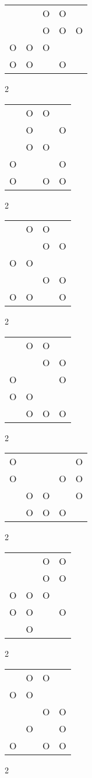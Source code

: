 \begin{tabular}{|m{0.2cm}m{0.2cm}m{0.2cm}m{0.2cm}m{0.2cm}|}\hline
 & &O&O& \\
 & &O&O&O\\
O&O&O& & \\
O&O& &O& \\
\hline\end{tabular}2
\begin{tabular}{|m{0.2cm}m{0.2cm}m{0.2cm}m{0.2cm}|}\hline
 &O&O& \\
 &O& &O\\
 &O&O& \\
O& & &O\\
O& &O&O\\
\hline\end{tabular}2
\begin{tabular}{|m{0.2cm}m{0.2cm}m{0.2cm}m{0.2cm}|}\hline
 &O&O& \\
 & &O&O\\
O&O& & \\
 & &O&O\\
O&O& &O\\
\hline\end{tabular}2
\begin{tabular}{|m{0.2cm}m{0.2cm}m{0.2cm}m{0.2cm}|}\hline
 &O&O& \\
 & &O&O\\
O& & &O\\
O&O& & \\
 &O&O&O\\
\hline\end{tabular}2
\begin{tabular}{|m{0.2cm}m{0.2cm}m{0.2cm}m{0.2cm}m{0.2cm}|}\hline
O& & & &O\\
O& & &O&O\\
 &O&O& &O\\
 &O&O&O& \\
\hline\end{tabular}2
\begin{tabular}{|m{0.2cm}m{0.2cm}m{0.2cm}m{0.2cm}|}\hline
 & &O&O\\
 & &O&O\\
O&O&O& \\
O&O& &O\\
 &O& & \\
\hline\end{tabular}2
\begin{tabular}{|m{0.2cm}m{0.2cm}m{0.2cm}m{0.2cm}|}\hline
 &O&O& \\
O&O& & \\
 & &O&O\\
 &O& &O\\
O& &O&O\\
\hline\end{tabular}2
